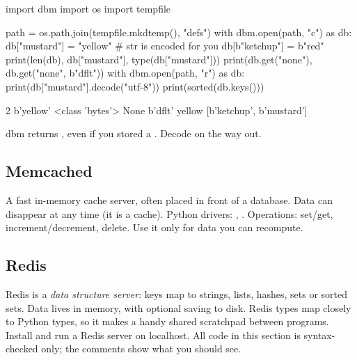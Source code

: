 \begin{pycode}
import dbm
import os
import tempfile

path = os.path.join(tempfile.mkdtemp(), "defs")
with dbm.open(path, "c") as db:
    db["mustard"] = "yellow"           # str is encoded for you
    db[b"ketchup"] = b"red"
    print(len(db), db["mustard"], type(db["mustard"]))
    print(db.get("none"), db.get("none", b"dflt"))
with dbm.open(path, "r") as db:
    print(db["mustard"].decode("utf-8"))
    print(sorted(db.keys()))
\end{pycode}
\begin{rawcode}
2 b'yellow' <class 'bytes'>
None b'dflt'
yellow
[b'ketchup', b'mustard']
\end{rawcode}

\begin{typecheck}
dbm returns , even if you stored a . Decode on the way out.
\end{typecheck}

\subsection{Memcached}

A fast in-memory cache server, often placed in front of a database. Data can disappear at
any time (it is a cache). Python drivers: , .
Operations: set/get, increment/decrement, delete. Use it only for data you can recompute.

\subsection{Redis}

Redis is a \emph{data structure server}: keys map to strings, lists, hashes, sets or sorted
sets. Data lives in memory, with optional saving to disk. Redis types map closely to
Python types, so it makes a handy shared scratchpad between programs. Install
 and run a Redis server on localhost. All code in this section is
syntax-checked only; the comments show what you should see.

